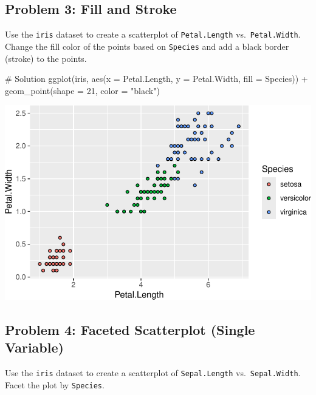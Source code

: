 \documentclass[
  letterpaper,
  DIV=11,
  numbers=noendperiod]{scrreprt}
\newenvironment{Shaded}{\begin{snugshade}}{\end{snugshade}}
\newcommand{\AttributeTok}[1]{\textcolor[rgb]{0.40,0.45,0.13}{#1}}
\newcommand{\CommentTok}[1]{\textcolor[rgb]{0.37,0.37,0.37}{#1}}
\newcommand{\DecValTok}[1]{\textcolor[rgb]{0.68,0.00,0.00}{#1}}
\newcommand{\FunctionTok}[1]{\textcolor[rgb]{0.28,0.35,0.67}{#1}}
\newcommand{\NormalTok}[1]{\textcolor[rgb]{0.00,0.23,0.31}{#1}}
\newcommand{\SpecialCharTok}[1]{\textcolor[rgb]{0.37,0.37,0.37}{#1}}
\newcommand{\StringTok}[1]{\textcolor[rgb]{0.13,0.47,0.30}{#1}}
\begin{document}
\subsection*{Problem 3: Fill and
Stroke}\label{problem-3-fill-and-stroke}

Use the \texttt{iris} dataset to create a scatterplot of
\texttt{Petal.Length} vs.~\texttt{Petal.Width}. Change the fill color of
the points based on \texttt{Species} and add a black border (stroke) to
the points.

\begin{Shaded}
\begin{Highlighting}[]
\CommentTok{\# Solution}
\FunctionTok{ggplot}\NormalTok{(iris, }\FunctionTok{aes}\NormalTok{(}\AttributeTok{x =}\NormalTok{ Petal.Length, }\AttributeTok{y =}\NormalTok{ Petal.Width, }\AttributeTok{fill =}\NormalTok{ Species)) }\SpecialCharTok{+}
  \FunctionTok{geom\_point}\NormalTok{(}\AttributeTok{shape =} \DecValTok{21}\NormalTok{, }\AttributeTok{color =} \StringTok{"black"}\NormalTok{)}
\end{Highlighting}
\end{Shaded}

\includegraphics{Advanced_Scatterplot_Techniques_files/figure-pdf/unnamed-chunk-22-1.pdf}

\subsection*{Problem 4: Faceted Scatterplot (Single
Variable)}\label{problem-4-faceted-scatterplot-single-variable}

Use the \texttt{iris} dataset to create a scatterplot of
\texttt{Sepal.Length} vs.~\texttt{Sepal.Width}. Facet the plot by
\texttt{Species}.
\end{document}
